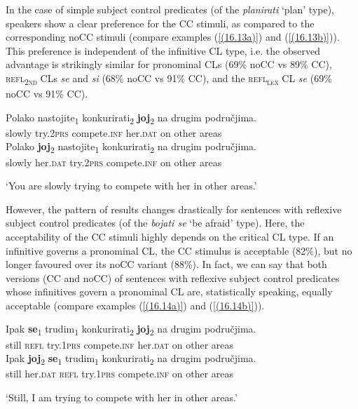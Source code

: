 In the case of simple subject control predicates (of the \textit{planirati} ‘plan’ type), speakers show a clear preference for the CC stimuli, as compared to the corresponding noCC stimuli (compare examples (\ref{(16.13a)}) and (\ref{(16.13b)})). This preference is independent of the infinitive CL type, i.e. the observed advantage is strikingly similar for pronominal CLs (69\% noCC vs 89\% CC), \textsc{refl\textsubscript{2nd}} CLs \textit{se} and \textit{si} (68\% noCC vs 91\% CC), and the \textsc{refl\textsubscript{\textsc{lex}}} CL \textit{se} (69\% noCC vs 91\% CC). 

\begin{exe}\ex\begin{xlist}
\ex\label{(16.13a)}
\gll Polako nastojite\textsubscript{1} konkurirati\textsubscript{2} \textbf{joj}\textsubscript{2} na drugim područjima.\\
 slowly try.2\textsc{prs} compete.\textsc{inf} her.\textsc{dat} on other areas \\
\ex\label{(16.13b)}
\gll Polako \textbf{joj}\textsubscript{2} nastojite\textsubscript{1} konkurirati\textsubscript{2} na drugim područjima.\\
 slowly her.\textsc{dat} try.2\textsc{prs} compete.\textsc{inf} on other areas \\
\end{xlist}\glt ‘You are slowly trying to compete with her in other areas.’ 
\end{exe}

\noindent However, the pattern of results changes drastically for sentences with reflexive subject control predicates (of the \textit{bojati se} ‘be afraid’ type). Here, the acceptability of the CC stimuli highly depends on the critical CL type. If an infinitive governs a pronominal CL, the CC stimulus is acceptable (82\%), but no longer favoured over its noCC variant (88\%). In fact, we can say that both versions (CC and noCC) of sentences with reflexive subject control predicates whose infinitives govern a pronominal CL are, statistically speaking, equally acceptable (compare examples (\ref{(16.14a)}) and (\ref{(16.14b)})). 

\begin{exe}\ex\begin{xlist}
\ex\label{(16.14a)}
\gll Ipak \textbf{se}\textsubscript{1} trudim\textsubscript{1} konkurirati\textsubscript{2} \textbf{joj}\textsubscript{2} na drugim područjima.\\
 still \textsc{refl} try.\textsc{1prs} compete.\textsc{inf} her.\textsc{dat} on other areas \\ 
\ex\label{(16.14b)}
\gll Ipak \textbf{joj}\textsubscript{2} \textbf{se}\textsubscript{1} trudim\textsubscript{1} konkurirati\textsubscript{2} na drugim područjima.\\
 still her.\textsc{dat} \textsc{refl} try.\textsc{1prs} compete.\textsc{inf}  on other areas \\ 
\end{xlist}\glt ‘Still, I am trying to compete with her in other areas.’ 
\end{exe}

